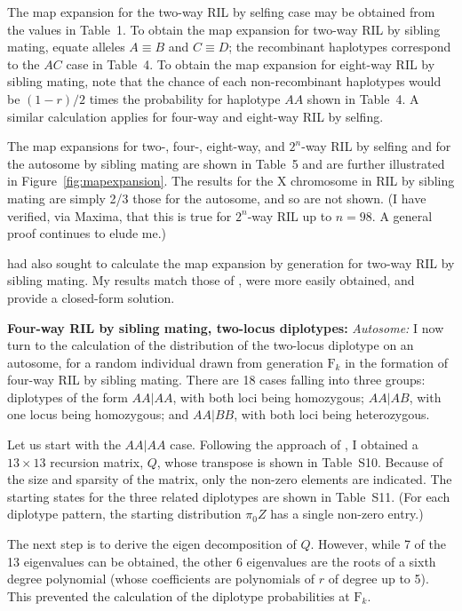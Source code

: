 \documentclass[12pt,letterpaper]{article}
\begin{document}
The map expansion for the two-way RIL by selfing case may be obtained
from the values in Table~1.  To obtain the map expansion for two-way RIL by
sibling mating, equate alleles $A \equiv B$ and $C \equiv D$;
the recombinant haplotypes correspond to the $AC$ case in Table~4.
To obtain the map expansion for eight-way RIL by sibling mating, 
note that the chance of each non-recombinant haplotypes would be
$(1-r)/2$ times the probability for haplotype $AA$ shown in Table~4.
A similar calculation applies for four-way and eight-way RIL by
selfing.  

The map expansions for two-, four-, eight-way, and $2^n$-way RIL by
selfing and for the autosome by sibling mating are shown in Table~5
and are further illustrated in Figure~\ref{fig:mapexpansion}.  The
results for the X chromosome in RIL by sibling mating are simply 2/3
those for the autosome, and so are not shown.  (I have verified, via
Maxima, that this is true for $2^n$-way RIL up to $n=98$.  A general
proof continues to elude me.)

\citet{Teuscher2005} had also sought to calculate the map expansion by
generation for two-way RIL by sibling mating.  My results match those
of \citet{Teuscher2005}, were more easily obtained, and provide
a closed-form solution.



\textbf{Four-way RIL by sibling mating, two-locus diplotypes:}
\emph{Autosome:} I now turn to the calculation of the distribution of
the two-locus diplotype on an autosome, for a random individual drawn
from generation $\text{F}_k$ in the formation of four-way RIL by
sibling mating.  There are 18 cases falling into
three groups: diplotypes of the form $AA|AA$, with both loci being
homozygous; $AA|AB$, with one locus being homozygous; and $AA|BB$,
with both loci being heterozygous.  

Let us start with the $AA|AA$ case.  Following the approach of
\citet{Kimura1963}, I obtained a $13 \times 13$ recursion matrix, $Q$,
whose transpose is shown in Table~S10.  Because of the size and
sparsity of the matrix, only the non-zero elements are indicated.  The
starting states for the three related diplotypes are shown in
Table~S11.  (For each diplotype pattern, the starting distribution
$\pi_0 Z$ has a single non-zero entry.)

The next step is to derive the eigen decomposition of
$Q$.  However, while 7 of the 13 eigenvalues can be obtained, the other
6 eigenvalues are the roots of a sixth degree polynomial (whose
coefficients are polynomials of $r$ of degree up to 5).  This prevented
the calculation of the diplotype probabilities at
$\text{F}_k$.  
\end{document}
